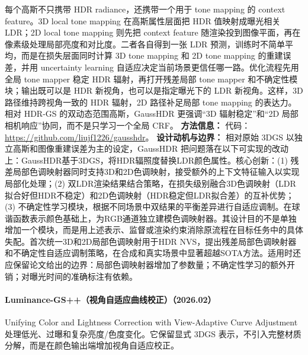 每个高斯不只携带 HDR radiance，还携带一个用于 tone mapping 的 context feature。3D local tone mapping 在高斯属性层面把 HDR 值映射成曝光相关 LDR；2D local tone mapping 则先把 context feature 随渲染投到图像平面，再在像素级处理局部亮度和对比度。二者各自得到一张 LDR 预测，训练时不简单平均，而是在损失层面同时计算 3D tone mapping 和 2D tone mapping 的重建误差，并用 uncertainty learning 自适应决定当前场景更信任哪一路。优化流程先用全局 tone mapper 稳定 HDR 辐射，再打开残差局部 tone mapper 和不确定性模块；输出既可以是 HDR 新视角，也可以是指定曝光下的 LDR 新视角。这样，3D 路径维持跨视角一致的 HDR 辐射，2D 路径补足局部 tone mapping 的表达力。相对 HDR-GS 的双动态范围高斯，GaussHDR 更强调“3D 辐射稳定”和“2D 局部相机响应”协同，而不是只学习一个全局 CRF。
\textbf{方法信息：} 代码：\url{https://github.com/liujf1226/gausshdr}。
\textbf{设计动机与边界：} 相对原始 3DGS 以独立高斯和图像重建误差为主的设定，GaussHDR 把问题落在以下可实现的改动上：GaussHDR基于3DGS，将HDR辐照度替换LDR颜色属性。核心创新：(1) 残差局部色调映射器同时支持3D和2D色调映射，接受额外的上下文特征输入以实现局部化处理；(2) 双LDR渲染结果结合策略，在损失级别融合3D色调映射（LDR拟合好但HDR不稳定）和2D色调映射（HDR稳定但LDR拟合差）的互补优势；(3) 不确定性学习模块，根据不同场景中双结果的平衡差异进行自适应调制。在球谐函数表示颜色基础上，为RGB通道独立建模色调映射器。其设计目的不是单独增加一个模块，而是用上述表示、监督或渲染约束消除原流程在目标任务中的具体失配。首次统一3D和2D局部色调映射用于HDR NVS，提出残差局部色调映射器和不确定性自适应调制策略，在合成和真实场景中显著超越SOTA方法。适用时还应保留论文给出的边界：局部色调映射器增加了参数量；不确定性学习的额外开销；对曝光时间的准确标注有依赖。
\paragraph{Luminance-GS++（视角自适应曲线校正）（2026.02）}
Unifying Color and Lightness Correction with View-Adaptive Curve Adjustment~\cite{2602_18322} 处理低光、过曝和复杂亮度/色度变化。它保留显式 3DGS 表示，不引入完整材质分解，而是在颜色输出端增加视角自适应校正。

